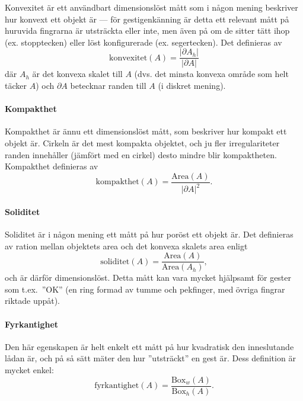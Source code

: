 \documentclass[../rapport_MVEX01-11-05]{subfiles}
\begin{document}
Konvexitet \cite[s.~26]{Rudemo09} är ett användbart dimensionslöst
mått som i någon mening beskriver hur konvext ett objekt är --- för
gestigenkänning är detta ett relevant mått på huruvida fingrarna är
utsträckta eller inte, men även på om de sitter tätt ihop (ex.
stopptecken) eller löst konfigurerade (ex. segertecken). Det
definieras av
\begin{equation*}
  \textrm{konvexitet}(A) = \frac{\left|\partial A_h\right|}{\left|\partial A\right|}
\end{equation*}
där $A_h$ är det konvexa skalet till $A$ (dvs. det minsta konvexa område som
helt täcker $A$) och $\partial A$ betecknar randen till $A$ (i diskret
mening).

\paragraph{Kompakthet}

Kompakthet \cite[s.~26]{Rudemo09} är ännu ett dimensionslöst mått, som
beskriver hur kompakt ett objekt är.
Cirkeln är det mest kompakta objektet, och ju fler irregulariteter
randen innehåller (jämfört med en cirkel) desto mindre blir kompaktheten.
Kompakthet definieras av
\begin{equation*}
  \textrm{kompakthet}(A) = \frac{\textrm{Area}(A)}{\left|\partial
  A\right|^2}.
\end{equation*}

\paragraph{Soliditet}

Soliditet är i någon mening ett mått på hur poröst ett objekt är. Det
definieras av ration mellan objektets area och det konvexa skalets
area enligt
\begin{equation*}
  \textrm{soliditet}(A) = \frac{\textrm{Area}(A)}{\textrm{Area}(A_h)},
\end{equation*}
och är därför dimensionslöst. Detta mått kan vara mycket hjälpsamt för
gester som t.ex.~''OK'' (en ring formad av tumme och pekfinger, med
övriga fingrar riktade uppåt).

\paragraph{Fyrkantighet}

Den här egenskapen är helt enkelt ett mått på hur kvadratisk den
inneslutande lådan är, och på så sätt mäter den hur ''utsträckt'' en
gest är. Dess definition är mycket enkel:
\begin{equation*}
  \textrm{fyrkantighet}(A) = \frac{\textrm{Box}_w(A)}{\textrm{Box}_h(A)}.
\end{equation*}
\end{document}
